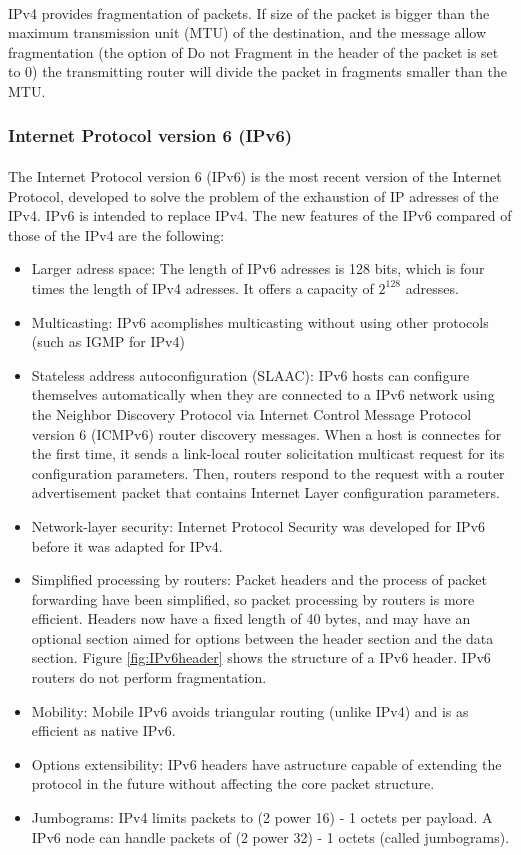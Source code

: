 \documentclass[12pt,a4paper]{report}
\begin{document}
\paragraph{}IPv4 provides fragmentation of packets. If size of the packet is bigger than the maximum transmission unit (MTU) of the destination, and the message allow fragmentation (the option of Do not Fragment in the header of the packet is set to 0) the transmitting router will divide the packet in fragments smaller than the MTU.

\subsubsection{Internet Protocol version 6 (IPv6)\cite{IPv6}}
\paragraph{}The Internet Protocol version 6 (IPv6) is the most recent version of the Internet Protocol, developed to solve the problem of the exhaustion of IP adresses of the IPv4. IPv6 is intended to replace IPv4. The new features of the IPv6 compared of those of the IPv4 are the following:
\begin{itemize}
	\item Larger adress space: The length of IPv6 adresses is 128 bits, which is four times the length of IPv4 adresses. It offers a capacity of $2^{128}$ adresses.
	\item Multicasting: IPv6 acomplishes multicasting without using other protocols (such as IGMP for IPv4)
	\item Stateless address autoconfiguration (SLAAC): IPv6 hosts can configure themselves automatically when they are connected to a IPv6 network using the Neighbor Discovery Protocol via Internet Control Message Protocol version 6 (ICMPv6) router discovery messages. When a host is connectes for the first time, it sends a link-local router solicitation multicast request for its configuration parameters. Then, routers respond to the request with a router advertisement packet that contains Internet Layer configuration parameters.
	\item Network-layer security: Internet Protocol Security was developed for IPv6 before it was adapted for IPv4.
	\item Simplified processing by routers: Packet headers and the process of packet forwarding have been simplified, so packet processing by routers is more efficient. Headers now have a fixed length of 40 bytes, and may have an optional section aimed for options between the header section and the data section. Figure \ref{fig:IPv6header} shows the structure of a IPv6 header. IPv6 routers do not perform fragmentation.
	\item Mobility: Mobile IPv6 avoids triangular routing (unlike IPv4) and is as efficient as native IPv6.
	\item Options extensibility: IPv6 headers have astructure capable of extending the protocol in the future without affecting the core packet structure.
	\item Jumbograms: IPv4 limits packets to (2 power 16) - 1 octets per payload. A IPv6 node can handle packets of (2 power 32) - 1 octets (called jumbograms).
\end{itemize}
\end{document}
